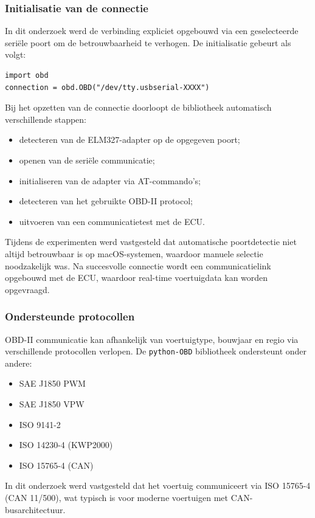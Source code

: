 \subsubsection{Initialisatie van de connectie}
In dit onderzoek werd de verbinding expliciet opgebouwd via een geselecteerde seriële poort om de betrouwbaarheid te verhogen. De initialisatie gebeurt als volgt:

\begin{verbatim}
import obd
connection = obd.OBD("/dev/tty.usbserial-XXXX")
\end{verbatim}

Bij het opzetten van de connectie doorloopt de bibliotheek automatisch verschillende stappen:
\begin{itemize}
    \item detecteren van de ELM327-adapter op de opgegeven poort;
    \item openen van de seriële communicatie;
    \item initialiseren van de adapter via AT-commando's;
    \item detecteren van het gebruikte OBD-II protocol;
    \item uitvoeren van een communicatietest met de ECU.
\end{itemize}
Tijdens de experimenten werd vastgesteld dat automatische poortdetectie niet altijd betrouwbaar is op macOS-systemen, waardoor manuele selectie noodzakelijk was.
Na succesvolle connectie wordt een communicatielink opgebouwd met de ECU, waardoor real-time voertuigdata kan worden opgevraagd.

\subsubsection{Ondersteunde protocollen}
OBD-II communicatie kan afhankelijk van voertuigtype, bouwjaar en regio via verschillende protocollen verlopen. De \texttt{python-OBD} bibliotheek ondersteunt onder andere:
\begin{itemize}
    \item SAE J1850 PWM
    \item SAE J1850 VPW
    \item ISO 9141-2
    \item ISO 14230-4 (KWP2000)
    \item ISO 15765-4 (CAN)
\end{itemize}
In dit onderzoek werd vastgesteld dat het voertuig communiceert via ISO 15765-4 (CAN 11/500), wat typisch is voor moderne voertuigen met CAN-busarchitectuur.

